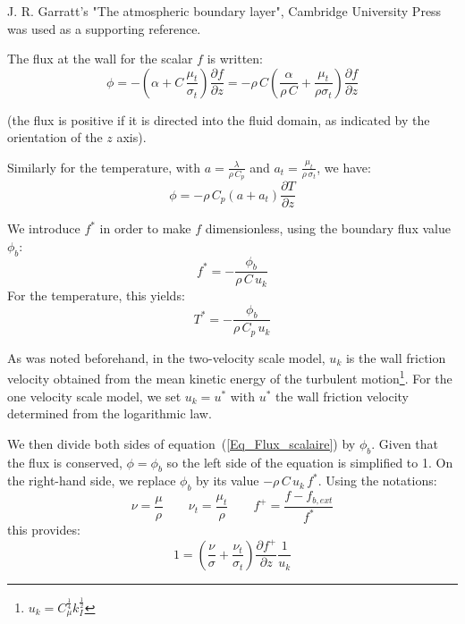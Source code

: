 J. R. Garratt's "The atmospheric boundary layer", Cambridge University Press was used
as a supporting reference.

The flux at the wall for the scalar $f$ is written:
\begin{equation}\label{Eq_Flux_scalaire}
\phi = -\left(\alpha+C\,\frac{\mu_t}{\sigma_t}\right)
                  \frac{\partial f}{\partial z}
     = -\rho\,C \left(\displaystyle\frac{\alpha}{\rho\,C}+
                                \frac{\mu_t}{\rho\sigma_t}\right)
                  \frac{\partial f}{\partial z}
\end{equation}

(the flux is positive if it is directed into the fluid domain, as indicated
by the orientation of the $z$ axis).

\noindent Similarly for the temperature, with $a=\displaystyle\frac{\lambda}{\rho\,C_p}$ and
$a_t=\displaystyle\frac{\mu_t}{\rho\,\sigma_t}$, we have:
\begin{equation}
\phi = -\rho\,C_p(a+a_t)\frac{\partial T}{\partial z}
\end{equation}

\noindent We introduce $f^*$ in order to make $f$ dimensionless, using the boundary flux
value $\phi_b$:
\begin{equation}
f^* = -\displaystyle\frac{\phi_b}{\rho\,C\,u_k}
\end{equation}
For the temperature, this yields:
\begin{equation}
T^* = -\displaystyle\frac{\phi_b}{\rho\,C_p\,u_k}
\end{equation}

\noindent As was noted beforehand, in the two-velocity scale model, $u_k$ is the
wall friction velocity obtained from the mean kinetic energy of the turbulent
motion\footnote{$u_k = C_\mu^\frac{1}{4}k_I^\frac{1}{2}$}. For the
one velocity scale model, we set $u_k=u^*$ with $u^*$ the wall friction velocity
determined from the logarithmic law.

We then divide both sides of equation~(\ref{Eq_Flux_scalaire})
by $\phi_b$. Given that the flux is conserved, $\phi=\phi_b$ so the left side of
the equation is simplified to 1. On the right-hand side, we replace
$\phi_b$ by its value $-\rho\,C\,u_k\,f^*$. Using the notations:
\begin{equation}
       \nu=\displaystyle\frac{\mu}{\rho}
\qquad \nu_t=\displaystyle\frac{\mu_t}{\rho}
\qquad f^+=\displaystyle\frac{f-f_{b,ext}}{f^*}
\end{equation}
this provides:
\begin{equation}\label{Eq_Flux_scalaire_adim}
1 =  \left(\displaystyle\frac{\nu}{\sigma}+
              \displaystyle\frac{\nu_t} {\sigma_t}\right)
                  \displaystyle\frac{\partial f^+}{\partial z} \displaystyle\frac{1}{u_k}
\end{equation}

